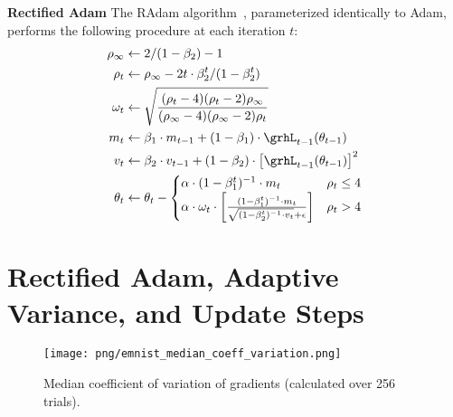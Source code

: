 {\textbf{Rectified Adam} \quad The RAdam algorithm~\citep{liu2019radam}, parameterized identically to Adam, performs the following procedure at each iteration $t$:
\begin{align}
    \rho_\infty &\leftarrow 2 / (1 - \beta_2) - 1 \label{eqn:radam-rhoinf} \\
    \rho_t &\leftarrow \rho_\infty - 2 t \cdot \beta_2^t / (1 - \beta_2^t) \label{eqn:radam-rhot} \\
    \omega_t &\leftarrow \sqrt{\frac{(\rho_t - 4) (\rho_t - 2) \rho_\infty}{(\rho_\infty - 4) (\rho_\infty - 2) \rho_t}} \label{eqn:radam-warmup} \\
    m_t &\leftarrow \beta_1 \cdot m_{t - 1} + (1 - \beta_1) \cdot \grhL_{t - 1}(\theta_{t - 1}) \label{eqn:radam-first-moment-update} \\
    v_t &\leftarrow \beta_2 \cdot v_{t - 1} + (1 - \beta_2) \cdot \left[ \grhL_{t - 1}(\theta_{t - 1}) \right]^2 \label{eqn:radam-second-moment-update} \\
    \theta_t &\leftarrow \theta_t - \begin{cases}
      \alpha \cdot (1 - \beta_1^t)^{-1} \cdot m_t & \rho_t \leq 4 \\
      \alpha \cdot \omega_t \cdot \left[ \frac{(1 - \beta_1^t)^{-1} \cdot m_t}{\sqrt{(1 - \beta_2^t)^{-1} \cdot v_t} + \epsilon} \right] & \rho_t > 4
    \end{cases} \label{eqn:radam-update-rule}
\end{align}\section{Rectified Adam, Adaptive Variance, and Update Steps}
\label{sec:radam}

\begin{figure*}[ht]
\centering

\captionsetup{
  justification=centering,
  margin=0.1in,
  size=normalsize
}

\begin{subfigure}[t]{.3302\linewidth}
  \centering

  \captionsetup{
    justification=centering,
    margin=0.1in,
    size=normalsize
  }

  \texttt{[image: png/emnist\_median\_coeff\_variation.png]}
  
  \caption{Median coefficient of variation of gradients (calculated over 256 trials).}
  

\end{subfigure}
\end{figure*}}
